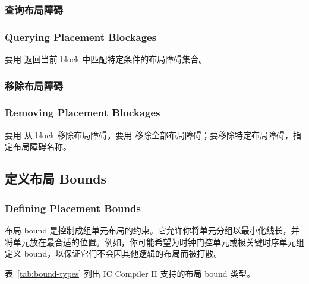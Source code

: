 \subsubsection{查询布局障碍}
\subsubsection*{Querying Placement Blockages}

要用  返回当前 block 中匹配特定条件的布局障碍集合。

\subsubsection{移除布局障碍}
\subsubsection*{Removing Placement Blockages}

要用  从 block 移除布局障碍。要用  移除全部布局障碍；要移除特定布局障碍，指定布局障碍名称。

\subsection{定义布局 Bounds}
\subsubsection*{Defining Placement Bounds}

布局 bound 是控制成组单元布局的约束。它允许你将单元分组以最小化线长，并将单元放在最合适的位置。例如，你可能希望为时钟门控单元或极关键时序单元组定义 bound，以保证它们不会因其他逻辑的布局而被打散。

表~\ref{tab:bound-types} 列出 IC Compiler II 支持的布局 bound 类型。

